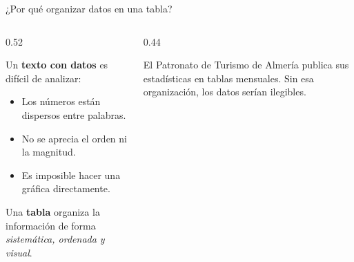 \documentclass[aspectratio=169, 10pt, spanish]{beamer}
\begin{document}
\begin{frame}[plain]
  \titlepage
\end{frame}

\begin{frame}{¿Por qué organizar datos en una tabla?}
  \begin{columns}[T]
    \begin{column}{0.52\textwidth}
      \begin{teoriabox}
        \AlmFontSmall
        Un \textbf{texto con datos} es difícil de analizar:
        \begin{itemize}
          \item Los números están dispersos entre palabras.
          \item No se aprecia el orden ni la magnitud.
          \item Es imposible hacer una gráfica directamente.
        \end{itemize}
        \vspace{4pt}
        Una \textbf{tabla} organiza la información de forma
        \textit{sistemática, ordenada y visual}.
      \end{teoriabox}
    \end{column}
    \begin{column}{0.44\textwidth}
      \begin{notabox}
        \AlmFontSmall
        El Patronato de Turismo de Almería publica sus estadísticas
        en tablas mensuales.
        Sin esa organización, los datos serían ilegibles.
      \end{notabox}

      \vspace{0.3cm}
      \begin{center}
      \end{center}
    \end{column}
  \end{columns}
\end{frame}
\end{document}
